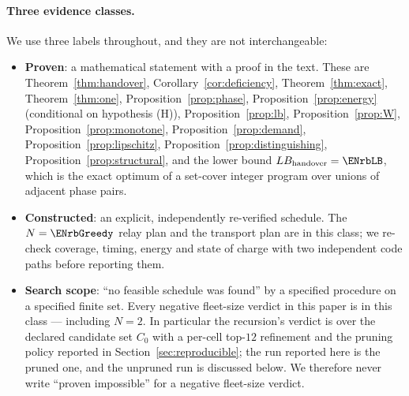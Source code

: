 \documentclass[11pt]{article}
\theoremstyle{dshplain}
\theoremstyle{dshdefn}
\begin{document}
\paragraph{Three evidence classes.}
We use three labels throughout, and they are not interchangeable:
\begin{itemize}[leftmargin=1.4em,itemsep=1pt]
\item \textbf{Proven}: a mathematical statement with a proof in the text. These
are Theorem~\ref{thm:handover}, Corollary~\ref{cor:deficiency},
Theorem~\ref{thm:exact}, Theorem~\ref{thm:one},
Proposition~\ref{prop:phase}, Proposition~\ref{prop:energy} (conditional on
hypothesis (H)), Proposition~\ref{prop:lb},
Proposition~\ref{prop:W}, Proposition~\ref{prop:monotone},
Proposition~\ref{prop:demand}, Proposition~\ref{prop:lipschitz},
Proposition~\ref{prop:distinguishing}, Proposition~\ref{prop:structural}, and the
lower bound $LB_{\mathrm{handover}}=\ENrbLB$, which is the exact optimum of a set-cover
integer program over unions of adjacent phase pairs.
\item \textbf{Constructed}: an explicit, independently re-verified schedule.
The $N=\ENrbGreedy$ relay plan and the transport plan are in this class; we
re-check coverage, timing, energy and state of charge with two independent code
paths before reporting them.
\item \textbf{Search scope}: ``no feasible schedule was found'' by a specified
procedure on a specified finite set. Every negative fleet-size verdict in this
paper is in this class --- including $N=2$. In particular the recursion's verdict
is over the declared candidate set $C_0$ with a per-cell top-$12$ refinement and
the pruning policy reported in Section~\ref{sec:reproducible}; the run reported
here is the pruned one, and the unpruned run is discussed below.
We therefore never write ``proven impossible'' for a negative fleet-size verdict.
\end{itemize}
\end{document}
